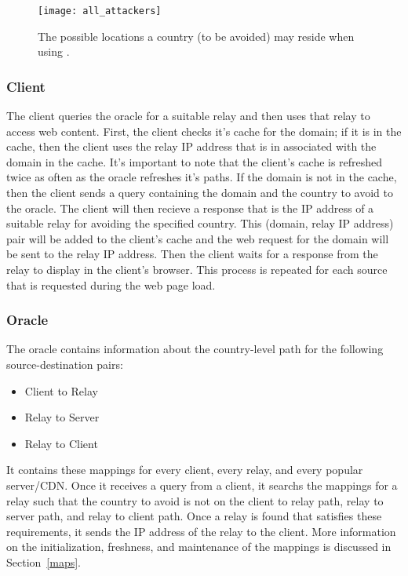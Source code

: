 \begin{figure}[t]
\centering
\texttt{[image: all\_attackers]}
\caption{The possible locations a country (to be avoided) may reside when using \system{}.}
\label{fig:advanced_threat}
\end{figure}

\subsubsection{Client} The client queries the oracle for a suitable relay and then uses that relay to access web content.  First, the client checks it's cache for the domain; if it is in the cache, then the client uses the relay IP address that is in associated with the domain in the cache.  It's important to note that the client's cache is refreshed twice as often as the oracle refreshes it's paths.  If the domain is not in the cache, then the client sends a query containing the domain and the country to avoid to the oracle.  The client will then recieve a response that is the IP address of a suitable relay for avoiding the specified country.  This (domain, relay IP address) pair will be added to the client's cache and the web request for the domain will be sent to the relay IP address.  Then the client waits for a response from the relay to display in the client's browser.  This process is repeated for each source that is requested during the web page load.  

\subsubsection{Oracle} The oracle contains information about the country-level path for the following source-destination pairs:

\begin{itemize}
\item Client to Relay
\item Relay to Server
\item Relay to Client
\end{itemize}

It contains these mappings for every client, every relay, and every popular server/CDN.  Once it receives a query from a client, it searchs the mappings for a relay such that the country to avoid is not on the client to relay path, relay to server path, and relay to client path.  Once a relay is found that satisfies these requirements, it sends the IP address of the relay to the client.  More information on the initialization, freshness, and maintenance of the mappings is discussed in Section~\ref{maps}.

